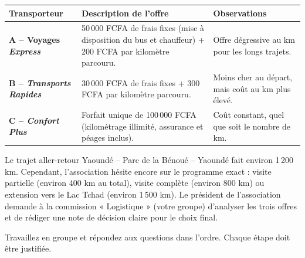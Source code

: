 \documentclass[11pt]{article}
\newcounter{popsec}
\newcounter{popsub}
\newcommand{\courssub}[1]{%
  \stepcounter{popsub}%
  \par\vspace{9pt}\noindent{\popxbold\fontsize{11.5}{13}\selectfont\color{popink}{\color{poporange}\thepopsec.\thepopsub}\hspace{6pt}#1}\par\nopagebreak\vspace{4pt}
}
\begin{document}
\begin{center}
\begin{tabularx}{\linewidth}{|l|X|X|}\hline
\textbf{Transporteur} & \textbf{Description de l'offre} & \textbf{Observations} \\ \hline
\textbf{A -- Voyages \emph{Express}} & 50\,000 FCFA de frais fixes (mise à disposition du bus et chauffeur) + 200 FCFA par kilomètre parcouru. & Offre dégressive au km pour les longs trajets. \\ \hline
\textbf{B -- \emph{Transports Rapides}} & 30\,000 FCFA de frais fixes + 300 FCFA par kilomètre parcouru. & Moins cher au départ, mais coût au km plus élevé. \\ \hline
\textbf{C -- \emph{Confort Plus}} & Forfait unique de 100\,000 FCFA (kilométrage illimité, assurance et péages inclus). & Coût constant, quel que soit le nombre de km. \\ \hline
\end{tabularx}
\end{center}

Le trajet aller-retour Yaoundé -- Parc de la Bénoué -- Yaoundé fait environ 1\,200 km. Cependant, l'association hésite encore sur le programme exact : visite partielle (environ 400 km au total), visite complète (environ 800 km) ou extension vers le Lac Tchad (environ 1\,500 km). Le président de l'association demande à la commission « Logistique » (votre groupe) d'analyser les trois offres et de rédiger une note de décision claire pour le choix final.

\courssub{Consignes}
Travaillez en groupe et répondez aux questions dans l'ordre. Chaque étape doit être justifiée.
\end{document}
